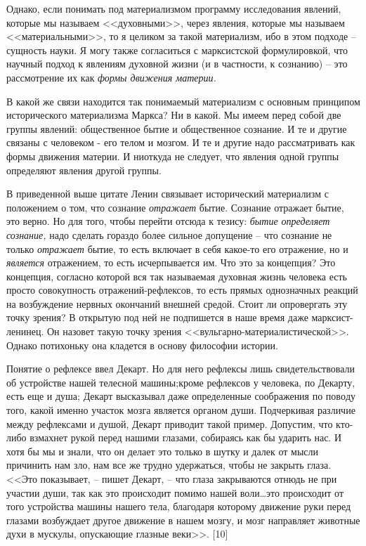\documentclass{book}
\begin{document}
Однако, если понимать под материализмом программу иссле­дования явлений, которые мы называем <<духовными>>, через явления, которые 
мы называем <<материальными>>, то я целиком за такой материализм, ибо в этом подходе -- сущность науки. Я могу также согласиться с 
марксистской формулировкой, что научный подход к явлениям духовной жизни (и в частности, к сознанию) -- это рассмотрение их как 
\textit{формы движения материи.}

В какой же связи находится так понимаемый материализм с основным принципом исторического материализма Маркса?
Ни в какой. Мы имеем перед собой две группы явлений: общественное бытие и общественное сознание. И те и другие связаны с 
человеком - его телом и мозгом. И те и другие надо рассматривать как формы движения материи. И ниоткуда не следует, что явления 
одной группы определяют явления другой группы.

В приведенной выше цитате Ленин связывает исторический материализм с положением о том, что сознание \textit{отражает}  бытие. 
Сознание отражает бытие, это верно. Но для того, чтобы перей­ти отсюда к тезису: \textit{бытие определяет сознание,}  надо 
сделать гораздо более сильное допущение -- что сознание не только \textit{от­ражает}  бытие, то есть включает в себя какое-то его 
отражение, но и \textit{является}  отражением, то есть исчерпывается им. Что это за концепция? Это концепция, согласно которой 
вся так назы­ваемая духовная жизнь человека есть просто совокупность отражений-рефлексов, то есть прямых однозначных реакций на 
возбуждение нервных окончаний внешней средой. Стоит ли опровергать эту точку зрения? В открытую под ней не подпи­шется в наше 
время даже марксист-ленинец. Он назовет такую точку зрения <<вульгарно-материалистической>>. Однако поти­хоньку она кладется в 
основу философии истории.

Понятие о рефлексе ввел Декарт. Но для него рефлексы лишь свидетельствовали об устройстве нашей телесной машины;кроме рефлексов 
у человека, по Декарту, есть еще и душа; Декарт высказывал даже определенные соображения по пово­ду того, какой именно участок 
мозга является органом души. Подчеркивая различие между рефлексами и душой, Декарт приводит такой пример. Допустим, что кто-либо 
взмахнет рукой перед нашими глазами, собираясь как бы ударить нас. И хотя бы мы и знали, что он делает это только в шутку и 
далек от мысли причинить нам зло, нам все же трудно удержаться, чтобы не закрыть глаза. <<Это показывает, -- пишет Декарт, -- что 
глаза закрываются отнюдь не при участии души, так как это происхо­дит помимо нашей воли\ldots это происходит от того устройства 
машины нашего тела, благодаря которому движение руки перед глазами возбуждает другое движение в нашем мозгу, и мозг направляет 
животные духи в мускулы, опускающие глазные веки>>. [10]
\end{document}

